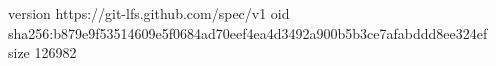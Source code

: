 version https://git-lfs.github.com/spec/v1
oid sha256:b879e9f53514609e5f0684ad70eef4ea4d3492a900b5b3ce7afabddd8ee324ef
size 126982
